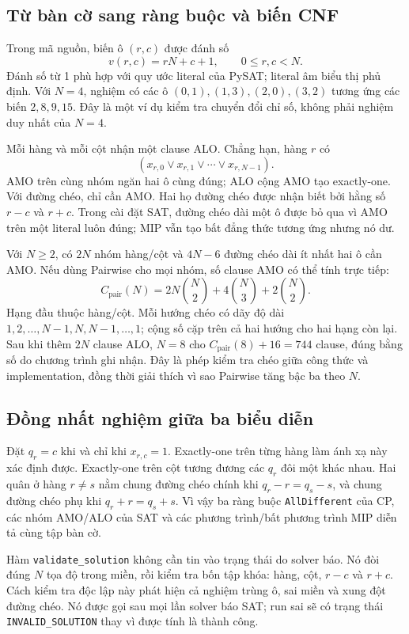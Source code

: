\subsection{Từ bàn cờ sang ràng buộc và biến CNF}

Trong mã nguồn, biến ô $(r,c)$ được đánh số
\begin{equation}
  v(r,c)=rN+c+1,\qquad 0\leq r,c<N.
\end{equation}
Đánh số từ 1 phù hợp với quy ước literal của PySAT; literal âm biểu thị phủ
định. Với $N=4$, nghiệm có các ô
$(0,1),(1,3),(2,0),(3,2)$ tương ứng các biến $2,8,9,15$. Đây là một ví
dụ kiểm tra chuyển đổi chỉ số, không phải nghiệm duy nhất của $N=4$.

Mỗi hàng và mỗi cột nhận một clause ALO. Chẳng hạn, hàng $r$ có
\begin{equation}
  (x_{r,0}\lor x_{r,1}\lor\cdots\lor x_{r,N-1}).
\end{equation}
AMO trên cùng nhóm ngăn hai ô cùng đúng; ALO cộng AMO tạo exactly-one.
Với đường chéo, chỉ cần AMO. Hai họ đường chéo được nhận biết bởi hằng số
$r-c$ và $r+c$. Trong cài đặt SAT, đường chéo dài một ô được bỏ qua vì AMO
trên một literal luôn đúng; MIP vẫn tạo bất đẳng thức tương ứng nhưng nó dư.

Với $N\geq2$, có $2N$ nhóm hàng/cột và $4N-6$ đường chéo dài ít nhất
hai ô cần AMO. Nếu dùng Pairwise cho mọi nhóm, số clause AMO có thể tính
trực tiếp:
\begin{equation}
 C_{\mathrm{pair}}(N)
 =2N\binom{N}{2}+4\binom{N}{3}+2\binom{N}{2}.
\end{equation}
Hạng đầu thuộc hàng/cột. Mỗi hướng chéo có dãy độ dài
$1,2,\ldots,N-1,N,N-1,\ldots,1$; cộng số cặp trên cả hai hướng cho hai hạng
còn lại. Sau khi thêm $2N$ clause ALO, $N=8$ cho
$C_{\mathrm{pair}}(8)+16=744$ clause, đúng bằng số do chương trình ghi nhận.
Đây là phép kiểm tra chéo giữa công thức và implementation, đồng thời giải
thích vì sao Pairwise tăng bậc ba theo $N$.

\subsection{Đồng nhất nghiệm giữa ba biểu diễn}

Đặt $q_r=c$ khi và chỉ khi $x_{r,c}=1$. Exactly-one trên từng hàng làm ánh
xạ này xác định được. Exactly-one trên cột tương đương các $q_r$ đôi một
khác nhau. Hai quân ở hàng $r\neq s$ nằm chung đường chéo chính khi
$q_r-r=q_s-s$, và chung đường chéo phụ khi $q_r+r=q_s+s$.
Vì vậy ba ràng buộc \texttt{AllDifferent} của CP, các nhóm AMO/ALO của
SAT và các phương trình/bất phương trình MIP diễn tả cùng tập bàn cờ.

Hàm \texttt{validate\_solution} không cần tin vào trạng thái do solver báo.
Nó đòi đúng $N$ tọa độ trong miền, rồi kiểm tra bốn tập khóa: hàng, cột,
$r-c$ và $r+c$. Cách kiểm tra độc lập này phát hiện cả nghiệm trùng ô,
sai miền và xung đột đường chéo. Nó được gọi sau mọi lần solver báo SAT;
run sai sẽ có trạng thái \texttt{INVALID\_SOLUTION} thay vì được tính là
thành công.
